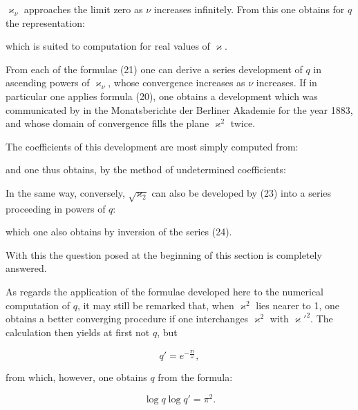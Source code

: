 $\varkappa_\nu$ approaches the limit zero as $\nu$ increases infinitely. From this one obtains for $q$ the representation:


which is suited to computation for real values of $\varkappa$.

From each of the formulae (21) one can derive a series development of $q$ in ascending powers of $\varkappa_\nu$, whose convergence increases as $\nu$ increases. If in particular one applies formula (20), one obtains a development which was communicated by  in the Monatsberichte der Berliner Akademie for the year 1883, and whose domain of convergence fills the plane $\varkappa^2$ twice.

The coefficients of this development are most simply computed from:


and one thus obtains, by the method of undetermined coefficients:


In the same way, conversely, $\sqrt{\varkappa_2}$ can also be developed by (23) into a series proceeding in powers of $q$:


which one also obtains by inversion of the series (24).

With this the question posed at the beginning of this section is completely answered.

As regards the application of the formulae developed here to the numerical computation of $q$, it may still be remarked that, when $\varkappa^2$ lies nearer to 1, one obtains a better converging procedure if one interchanges $\varkappa^2$ with $\varkappa'^2$. The calculation then yields at first not $q$, but

\[
q' = e^{-\frac{\pi i}{\omega}},
\]

from which, however, one obtains $q$ from the formula:

\[
\log q \log q' = \pi^2.
\]
